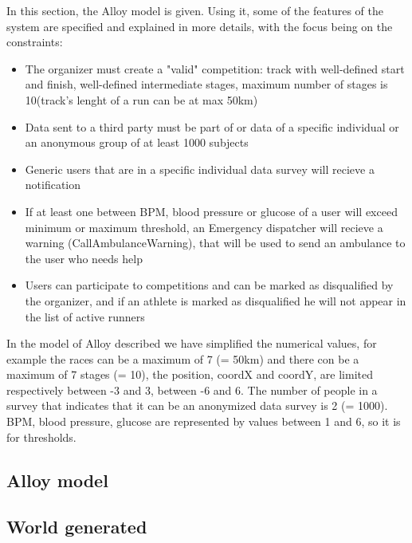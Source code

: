 
%
In this section, the Alloy model is given. Using it, some of the features of the system are specified and explained in more details, with the focus being on the constraints:
\begin{itemize}
\item The organizer must create a "valid" competition: track with well-defined start and finish, well-defined intermediate stages, maximum number of stages is 10(track's lenght of a run can be at max 50km)
\item Data sent to a third party must be part of or data of a specific individual or an anonymous group of at least 1000 subjects
\item Generic users that are in a specific individual data survey will recieve a notification
\item If at least one between BPM, blood pressure or glucose of a user will exceed minimum or maximum threshold, an Emergency dispatcher will recieve a warning (CallAmbulanceWarning), that will be used to send an ambulance to the user who needs help
\item Users can participate to competitions and can be marked as disqualified by the organizer, and if an athlete is marked as disqualified he will not appear in the list of active runners
\end{itemize}

In the model of Alloy described we have simplified the numerical values, for example the races can be a maximum of 7 (= 50km) and there con be a maximum of 7 stages (= 10), the position, coordX and coordY, are limited respectively between -3 and 3, between -6 and 6. The number of people in a survey that indicates that it can be an anonymized data survey is 2 (= 1000). BPM, blood pressure, glucose are represented by values between 1 and 6, so it is for thresholds. 
\subsection{Alloy model}

\clearpage
\subsection{World generated}

%
